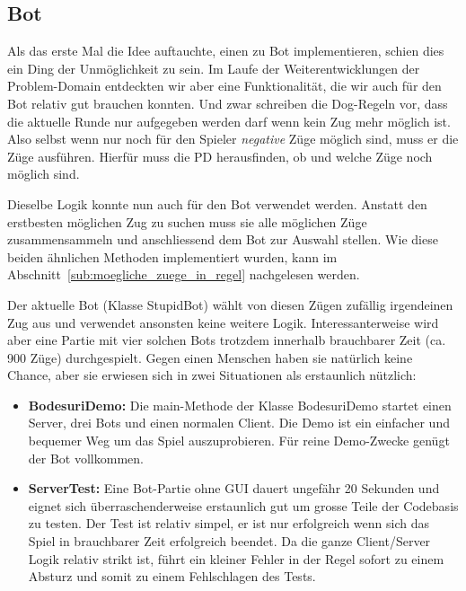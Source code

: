 \documentclass[12pt,halfparskip]{scrartcl}
\begin{document}

\subsection{Bot}

Als das erste Mal die Idee auftauchte, einen zu Bot implementieren, schien dies ein Ding der Unmöglichkeit zu sein. Im Laufe der Weiterentwicklungen der Problem-Domain entdeckten wir aber eine Funktionalität, die wir auch für den Bot relativ gut brauchen konnten. Und zwar schreiben die Dog-Regeln vor, dass die aktuelle Runde nur aufgegeben werden darf wenn kein Zug mehr möglich ist. Also selbst wenn nur noch für den Spieler \emph{negative} Züge möglich sind, muss er die Züge ausführen. Hierfür muss die PD herausfinden, ob und welche Züge noch möglich sind.

Dieselbe Logik konnte nun auch für den Bot verwendet werden. Anstatt den erstbesten möglichen Zug zu suchen muss sie alle möglichen Züge zusammensammeln und anschliessend dem Bot zur Auswahl stellen. Wie diese beiden ähnlichen Methoden implementiert wurden, kann im Abschnitt~\vref{sub:moegliche_zuege_in_regel} nachgelesen werden.

Der aktuelle Bot (Klasse StupidBot) wählt von diesen Zügen zufällig irgendeinen Zug aus und verwendet ansonsten keine weitere Logik. Interessanterweise wird aber eine Partie mit vier solchen Bots trotzdem innerhalb brauchbarer Zeit (ca. 900 Züge) durchgespielt. Gegen einen Menschen haben sie natürlich keine Chance, aber sie erwiesen sich in zwei Situationen als erstaunlich nützlich:

\begin{itemize}
	\item \textbf{BodesuriDemo:} Die main-Methode der Klasse BodesuriDemo startet einen Server, drei Bots und einen normalen Client. Die Demo ist ein einfacher und bequemer Weg um das Spiel auszuprobieren. Für reine Demo-Zwecke genügt der Bot vollkommen.
	\item \textbf{ServerTest:} Eine Bot-Partie ohne GUI dauert ungefähr 20 Sekunden und eignet sich überraschenderweise erstaunlich gut um grosse Teile der Codebasis zu testen. Der Test ist relativ simpel, er ist nur erfolgreich wenn sich das Spiel in brauchbarer Zeit erfolgreich beendet. Da die ganze Client/Server Logik relativ strikt ist, führt ein kleiner Fehler in der Regel sofort zu einem Absturz und somit zu einem Fehlschlagen des Tests.
\end{itemize}

\clearpage
\listoffigures
\end{document}
